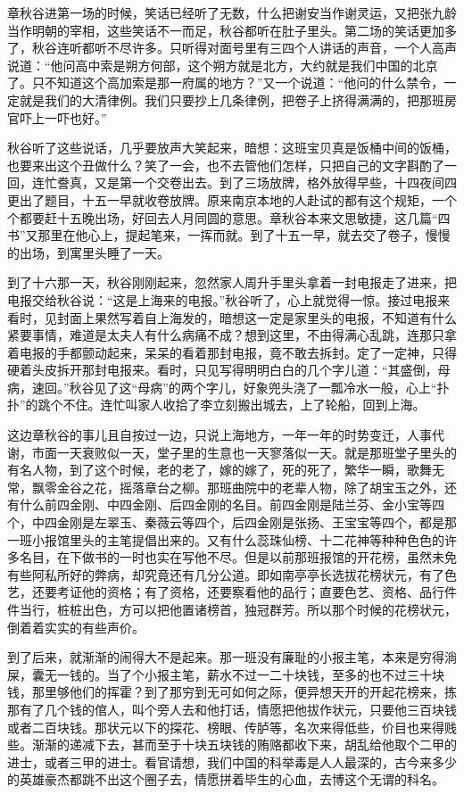 \documentclass[12pt,UTF8]{ctexbook}
\begin{document}
{{{章秋谷进第一场的时候，笑话已经听了无数，什么把谢安当作谢灵运，又把张九龄当作明朝的宰相，这些笑话不一而足，秋谷都听在肚子里头。第二场的笑话更加多了，秋谷连听都听不尽许多。只听得对面号里有三四个人讲话的声音，一个人高声说道：“他问高中索是朔方何部，这个朔方就是北方，大约就是我们中国的北京了。只不知道这个高加索是那一府属的地方？”又一个说道：“他问的什么禁令，一定就是我们的大清律例。我们只要抄上几条律例，把卷子上挤得满满的，把那班房官吓上一吓也好。”

秋谷听了这些说话，几乎要放声大笑起来，暗想：这班宝贝真是饭桶中间的饭桶，也要来出这个丑做什么？笑了一会，也不去管他们怎样，只把自己的文字斟酌了一回，连忙誊真，又是第一个交卷出去。到了三场放牌，格外放得早些，十四夜间四更出了题目，十五一早就收卷放牌。原来南京本地的人赴试的都有这个规矩，一个个都要赶十五晚出场，好回去人月同圆的意思。章秋谷本来文思敏捷，这几篇“四书”又那里在他心上，提起笔来，一挥而就。到了十五一早，就去交了卷子，慢慢的出场，到寓里头睡了一天。

到了十六那一天，秋谷刚刚起来，忽然家人周升手里头拿着一封电报走了进来，把电报交给秋谷说：“这是上海来的电报。”秋谷听了，心上就觉得一惊。接过电报来看时，见封面上果然写着自上海发的，暗想这一定是家里头的电报，不知道有什么紧要事情，难道是太夫人有什么病痛不成？想到这里，不由得满心乱跳，连那只拿着电报的手都颤动起来，呆呆的看着那封电报，竟不敢去拆封。定了一定神，只得硬着头皮拆开那封电报来。看时，只见写得明明白白的几个字儿道：“其盛倒，母病，速回。”秋谷见了这“母病”的两个字儿，好象兜头浇了一瓢冷水一般，心上“扑扑”的跳个不住。连忙叫家人收拾了李立刻搬出城去，上了轮船，回到上海。

这边章秋谷的事儿且自按过一边，只说上海地方，一年一年的时势变迁，人事代谢，市面一天衰败似一天，堂子里的生意也一天寥落似一天。就是那班堂子里头的有名人物，到了这个时候，老的老了，嫁的嫁了，死的死了，繁华一瞬，歌舞无常，飘零金谷之花，摇落章台之柳。那班曲院中的老辈人物，除了胡宝玉之外，还有什么前四金刚、中四金刚、后四金刚的名目。前四金刚是陆兰芬、金小宝等四个，中四金刚是左翠玉、秦薇云等四个，后四金刚是张扬、王宝宝等四个，都是那一班小报馆里头的主笔提倡出来的。又有什么蕊珠仙榜、十二花神等种种色色的许多名目，在下做书的一时也实在写他不尽。但是以前那班报馆的开花榜，虽然未免有些阿私所好的弊病，却究竟还有几分公道。即如南亭亭长选拔花榜状元，有了色艺，还要考证他的资格；有了资格，还要察看他的品行；直要色艺、资格、品行件件当行，桩桩出色，方可以把他置诸榜首，独冠群芳。所以那个时候的花榜状元，倒着着实实的有些声价。

到了后来，就渐渐的闹得大不是起来。那一班没有廉耻的小报主笔，本来是穷得淌屎，囊无一钱的。当了个小报主笔，薪水不过一二十块钱，至多的也不过三十块钱，那里够他们的挥霍？到了那穷到无可如何之际，便异想天开的开起花榜来，拣那有了几个钱的倌人，叫个旁人去和他打话，情愿把他拔作状元，只要他三百块钱或者二百块钱。那状元以下的探花、榜眼、传胪等，名次来得低些，价目也来得贱些。渐渐的递减下去，甚而至于十块五块钱的贿赂都收下来，胡乱给他取个二甲的进士，或者三甲的进士。看官请想，我们中国的科举毒是人人最深的，古今来多少的英雄豪杰都跳不出这个圈子去，情愿拼着毕生的心血，去博这个无谓的科名。

}}}
\end{document}
